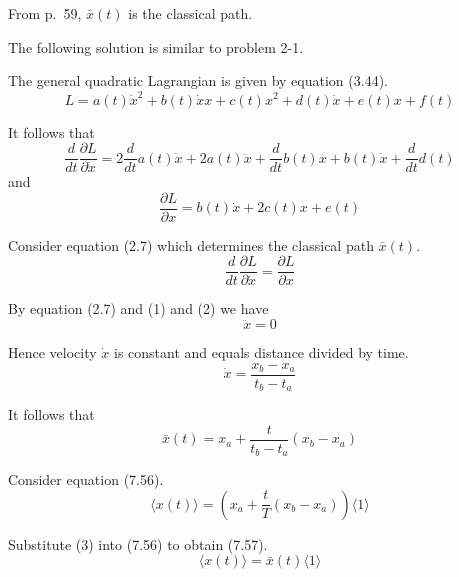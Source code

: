 


\bigskip
From p.~59, $\bar x(t)$ is the classical path.

\bigskip
The following solution is similar to problem 2-1.

\bigskip
The general quadratic Lagrangian is given by equation (3.44).
\begin{equation*}
L=a(t)\dot x^2+b(t)\dot xx+c(t)x^2+d(t)\dot x+e(t)x+f(t)
\tag{3.44}
\end{equation*}

It follows that
\begin{equation*}
\frac{d}{dt}\frac{\partial L}{\partial\dot x}
=2\frac{d}{dt}a(t)\dot x+2a(t)\ddot x
+\frac{d}{dt}b(t)x+b(t)\dot x+\frac{d}{dt}d(t)
\tag{1}
\end{equation*}
and
\begin{equation*}
\frac{\partial L}{\partial x}
=b(t)\dot x+2c(t)x+e(t)
\tag{2}
\end{equation*}

Consider equation (2.7) which determines the classical path $\bar x(t)$.
\begin{equation*}
\frac{d}{dt}\frac{\partial L}{\partial\dot x}=\frac{\partial L}{\partial x}
\tag{2.7}
\end{equation*}

By equation (2.7) and (1) and (2) we have
\begin{equation*}
\ddot x=0
\end{equation*}

Hence velocity $\dot x$ is constant and equals distance divided by time.
\begin{equation*}
\dot x=\frac{x_b-x_a}{t_b-t_a}
\end{equation*}

It follows that
\begin{equation*}
\bar x(t)=x_a+\frac{t}{t_b-t_a}(x_b-x_a)
\tag{3}
\end{equation*}

Consider equation (7.56).
\begin{equation*}
\langle x(t)\rangle=
\left(x_a+\frac{t}{T}(x_b-x_a)\right)\langle1\rangle
\tag{7.56}
\end{equation*}

Substitute (3) into (7.56) to obtain (7.57).
\begin{equation*}
\langle x(t)\rangle=\bar x(t)\langle1\rangle
\tag{7.57}
\end{equation*}


